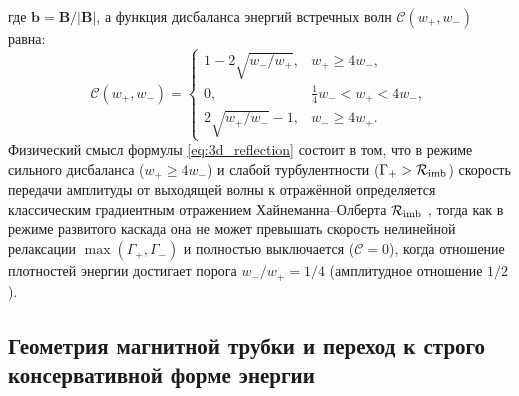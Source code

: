\documentclass[11pt,a4paper]{article}
\begin{document}
где $\bm{b} = \bm{B}/|\bm{B}|$, а функция дисбаланса энергий встречных волн $\mathcal{C}(w_+, w_-)$ равна:
\begin{equation}
\mathcal{C}(w_+, w_-) =
\begin{cases}
1 - 2\sqrt{w_-/w_+}, & w_+ \ge 4w_-,\\[4pt]
0, & \frac{1}{4}w_- < w_+ < 4w_-,\\[4pt]
2\sqrt{w_+/w_-} - 1, & w_- \ge 4w_+.
\end{cases}
\label{eq:imbalance_func}
\end{equation}
Физический смысл формулы \eqref{eq:3d_reflection} состоит в том, что в режиме сильного дисбаланса ($w_+ \ge 4w_-$) и слабой турбулентности ($\Gamma_+ > \mathcal{R}_{\rm imb}$) скорость передачи амплитуды от выходящей волны к отражённой определяется классическим градиентным отражением Хайнеманна--Олберта $\mathcal{R}_{\rm imb}$ \cite{HeinemannOlbert1980}, тогда как в режиме развитого каскада она не может превышать скорость нелинейной релаксации $\max(\Gamma_+,\Gamma_-)$ и полностью выключается ($\mathcal{C}=0$), когда отношение плотностей энергии достигает порога $w_-/w_+ = 1/4$ (амплитудное отношение $1/2$).

\subsection{Геометрия магнитной трубки и переход к строго консервативной форме энергии}
\end{document}

